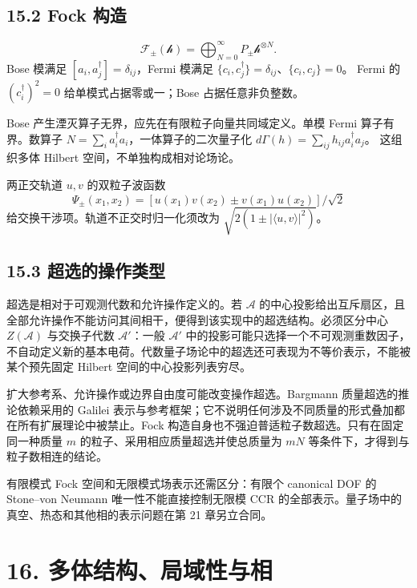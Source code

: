 \documentclass[
  11pt,
  oneside]{book}
\begin{document}
\hypertarget{fock-ux6784ux9020}{%
\section{15.2 Fock 构造}\label{fock-ux6784ux9020}}

\[
\mathcal F_\pm(\mathcal h)=\bigoplus_{N=0}^\infty
P_\pm\mathcal h^{\otimes N}.
\] Bose 模满足 \([a_i,a_j^\dagger]=\delta_{ij}\)，Fermi 模满足
\(\{c_i,c_j^\dagger\}=\delta_{ij}\)、\(\{c_i,c_j\}=0\)。 Fermi 的
\((c_i^\dagger)^2=0\) 给单模式占据零或一；Bose 占据任意非负整数。

Bose 产生湮灭算子无界，应先在有限粒子向量共同域定义。单模 Fermi
算子有界。数算子 \(N=\sum_i a_i^\dagger a_i\)，一体算子的二次量子化
\(d\Gamma(h)=\sum_{ij}h_{ij}a_i^\dagger a_j\)。 这组织多体 Hilbert
空间，不单独构成相对论场论。

两正交轨道 \(u,v\) 的双粒子波函数 \[
\Psi_\pm(x_1,x_2)=
[u(x_1)v(x_2)\pm v(x_1)u(x_2)]/\sqrt2
\] 给交换干涉项。轨道不正交时归一化须改为
\(\sqrt{2(1\pm|\langle u,v\rangle|^2)}\)。

\hypertarget{ux8d85ux9009ux7684ux64cdux4f5cux7c7bux578b}{%
\section{15.3
超选的操作类型}\label{ux8d85ux9009ux7684ux64cdux4f5cux7c7bux578b}}

超选是相对于可观测代数和允许操作定义的。若 \(\mathcal A\)
的中心投影给出互斥扇区，且全部允许操作不能访问其间相干，便得到该实现中的超选结构。必须区分中心
\(Z(\mathcal A)\) 与交换子代数 \(\mathcal A'\)：一般 \(\mathcal A'\)
中的投影可能只选择一个不可观测重数因子，不自动定义新的基本电荷。代数量子场论中的超选还可表现为不等价表示，不能被某个预先固定
Hilbert 空间的中心投影列表穷尽。

扩大参考系、允许操作或边界自由度可能改变操作超选。Bargmann
质量超选的推论依赖采用的 Galilei
表示与参考框架；它不说明任何涉及不同质量的形式叠加都在所有扩展理论中被禁止。Fock
构造自身也不强迫普适粒子数超选。只有在固定同一种质量 \(m\)
的粒子、采用相应质量超选并使总质量为 \(mN\)
等条件下，才得到与粒子数相连的结论。

有限模式 Fock 空间和无限模式场表示还需区分：有限个 canonical DOF 的
Stone--von Neumann 唯一性不能直接控制无限模 CCR
的全部表示。量子场中的真空、热态和其他相的表示问题在第 21 章另立合同。

\hypertarget{ch-16}{%
\chapter{16. 多体结构、局域性与相}\label{ch-16}}
\end{document}
